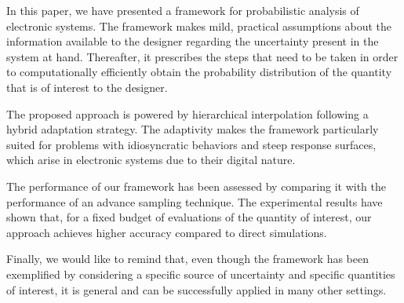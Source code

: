 In this paper, we have presented a framework for probabilistic analysis of
electronic systems. The framework makes mild, practical assumptions about the
information available to the designer regarding the uncertainty present in the
system at hand. Thereafter, it prescribes the steps that need to be taken in
order to computationally efficiently obtain the probability distribution of the
quantity that is of interest to the designer.

The proposed approach is powered by hierarchical interpolation following a
hybrid adaptation strategy. The adaptivity makes the framework particularly
suited for problems with idiosyncratic behaviors and steep response surfaces,
which arise in electronic systems due to their digital nature.

The performance of our framework has been assessed by comparing it with the
performance of an advance sampling technique. The experimental results have
shown that, for a fixed budget of evaluations of the quantity of interest, our
approach achieves higher accuracy compared to direct simulations.

Finally, we would like to remind that, even though the framework has been
exemplified by considering a specific source of uncertainty and specific
quantities of interest, it is general and can be successfully applied in many
other settings.
